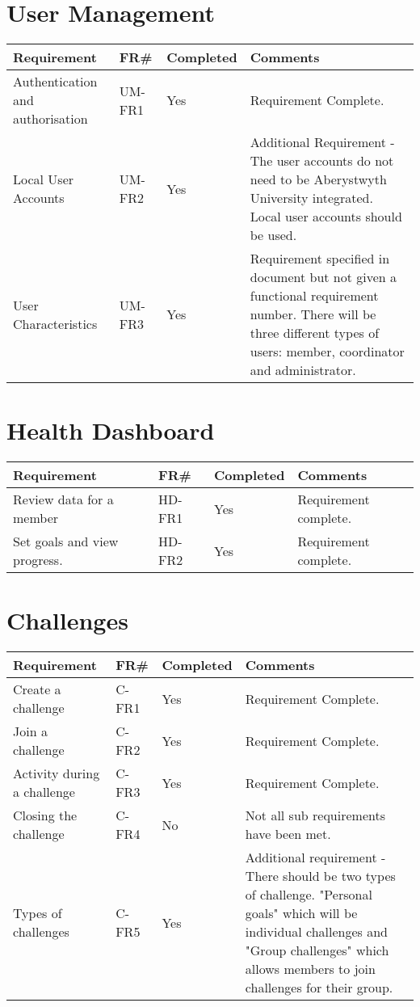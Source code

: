 \section{User Management}
\begin{tabular}{ |p{5cm}|l|l|p{8cm}|}
\hline
\textbf{Requirement}	&	\textbf{FR\#}	&	\textbf{Completed}	&	\textbf{Comments} \\
\hline
Authentication and authorisation 					& UM-FR1 	& Yes 		& Requirement Complete. \\
\hline
Local User Accounts 								& UM-FR2 	& Yes 		& Additional Requirement - The user accounts do not need to be Aberystwyth University integrated. Local user accounts should be used. \\
\hline
User Characteristics								& UM-FR3	& Yes		& Requirement specified in document but not given a functional requirement number. There will be three different types of users: member, coordinator and administrator. \\

\hline
\end{tabular}



\section{Health Dashboard}
\begin{tabular}{ |p{5cm}|l|l|p{8cm}|}
\hline
\textbf{Requirement}	&	\textbf{FR\#}	&	\textbf{Completed}	&	\textbf{Comments} \\
\hline
Review data for a member 							& HD-FR1 	& Yes 		& Requirement complete. \\
\hline
Set goals and view progress. 						& HD-FR2 	& Yes		& Requirement complete. \\

\hline
\end{tabular}


\section{Challenges}
\begin{tabular}{ |p{5cm}|l|l|p{8cm}|}
\hline
\textbf{Requirement}	&	\textbf{FR\#}	&	\textbf{Completed}	&	\textbf{Comments} \\
\hline
Create a challenge 									& C-FR1 	& Yes 		& Requirement Complete. \\
\hline
Join a challenge 									& C-FR2 	& Yes  		& Requirement Complete. \\
\hline
Activity during a challenge							& C-FR3 	& Yes 		& Requirement Complete. \\
\hline
Closing the challenge								& C-FR4		& No 		& Not all sub requirements have been met. \\
\hline
Types of challenges 								& C-FR5 	& Yes		& Additional requirement - There should be two types of challenge. "Personal goals" which will be individual challenges and "Group challenges" which allows members to join challenges for their group. \\

\hline
\end{tabular}


